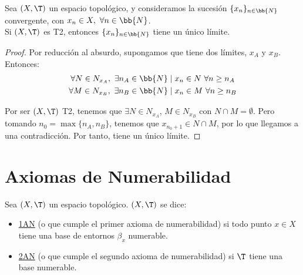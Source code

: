 \begin{prop}\label{prop:T2UnicidadLimite}
    Sea $(X,\T)$ un espacio topológico, y consideramos la sucesión $\{x_n\}_{n\in \bb{N}}$ convergente, con $x_n\in X,~\forall n\in \bb{N}$.\\

    Si $(X,\T)$ es T2, entonces $\{x_n\}_{n\in \bb{N}}$ tiene un único límite.
\end{prop}
\begin{proof}
    Por reducción al absurdo, supongamos que tiene dos límites, $x_A$ y $x_B$. Entonces:
    \begin{gather*}
        \forall N\in N_{x_A},~\exists n_A\in \bb{N}\mid x_n\in N~\forall n\geq n_A \\
        \forall M\in N_{x_B},~\exists n_B\in \bb{N}\mid x_n\in M~\forall n\geq n_B
    \end{gather*}

    Por ser $(X,\T)$ T2, tenemos que $\exists N\in N_{x_A}$, $M\in N_{x_B}$ con $N\cap M=\emptyset$. Pero tomando $n_0=\max\{n_A,n_B\}$, tenemos que $x_{n_0+1}\in N\cap M$, por lo que llegamos a una contradicción. Por tanto, tiene un único límite.
\end{proof}



\section{Axiomas de Numerabilidad}
\begin{definicion}
    Sea $(X,\T)$ un espacio topológico. $(X,\T)$ se dice:
    \begin{itemize}
        \item \ul{1AN} (o que cumple el primer axioma de numerabilidad) si todo punto $x\in X$ tiene una base de entornos $\beta_x$ numerable.
        \item \ul{2AN} (o que cumple el segundo axioma de numerabilidad) si $\T$ tiene una base numerable.
    \end{itemize}
\end{definicion}

